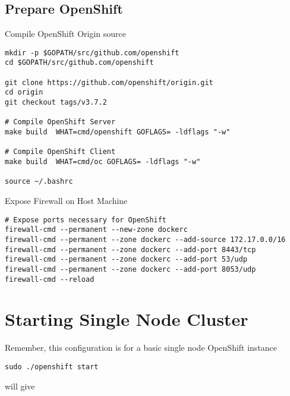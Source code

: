\documentclass{article}
\begin{document}
\subsection{Prepare OpenShift}

Compile OpenShift Origin source
\begin{lstlisting}
mkdir -p $GOPATH/src/github.com/openshift
cd $GOPATH/src/github.com/openshift

git clone https://github.com/openshift/origin.git
cd origin
git checkout tags/v3.7.2

# Compile OpenShift Server
make build  WHAT=cmd/openshift GOFLAGS= -ldflags "-w"

# Compile OpenShift Client
make build  WHAT=cmd/oc GOFLAGS= -ldflags "-w"

source ~/.bashrc
\end{lstlisting}

Expose Firewall on Host Machine

\begin{lstlisting}
# Expose ports necessary for OpenShift
firewall-cmd --permanent --new-zone dockerc
firewall-cmd --permanent --zone dockerc --add-source 172.17.0.0/16
firewall-cmd --permanent --zone dockerc --add-port 8443/tcp
firewall-cmd --permanent --zone dockerc --add-port 53/udp
firewall-cmd --permanent --zone dockerc --add-port 8053/udp
firewall-cmd --reload
\end{lstlisting}

\section{Starting Single Node Cluster}
Remember, this configuration is for a basic single node OpenShift instance 

\begin{lstlisting}
sudo ./openshift start
\end{lstlisting}

will give
\end{document}

